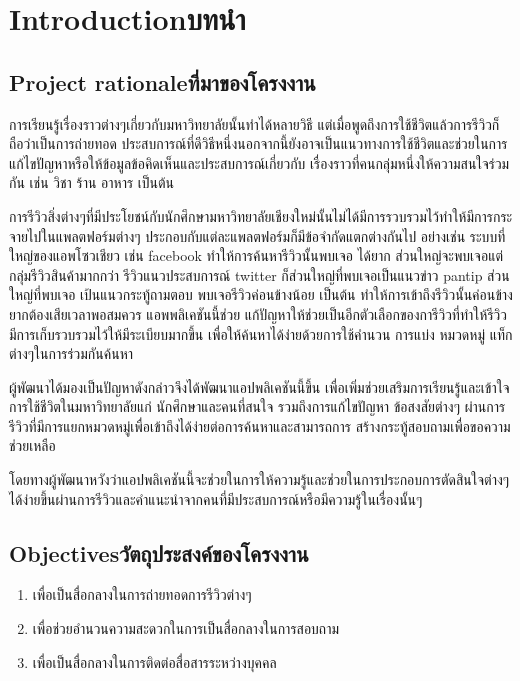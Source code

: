 \chapter{\ifenglish Introduction\else บทนำ\fi}

\section{\ifenglish Project rationale\else ที่มาของโครงงาน\fi}

การเรียนรู้เรื่องราวต่างๆเกี่ยวกับมหาวิทยาลัยนั้นทําได้หลายวิธี แต่เมื่อพูดถึงการใช้ชีวิตแล้วการรีวิวก็ถือว่าเป็นการถ่ายทอด
ประสบการณ์ที่ดีวิธีหนึ่งนอกจากนี้ยังอาจเป็นแนวทางการใช้ชีวิตและช่วยในการแก้ไขปัญหาหรือให้ข้อมูลข้อคิดเห็นและประสบการณ์เกี่ยวกับ
เรื่องราวที่คนกลุ่มหนึ่งให้ความสนใจร่วมกัน เช่น วิชา ร้าน อาหาร เป็นต้น

การรีวิวสิ่งต่างๆที่มีประโยชน์กับนักศึกษามหาวิทยาลัยเชียงใหม่นั้นไม่ได้มีการรวบรวมไว้ทําให้มีการกระจายไปในแพลตฟอร์มต่างๆ
ประกอบกับแต่ละแพลตฟอร์มก็มีข้อจํากัดแตกต่างกันไป อย่างเช่น ระบบที่ใหญ่ของแอพโซวเชียว เช่น facebook ทำให้การค้นหารีวิวนั้นพบเจอ
ได้ยาก ส่วนใหญ่จะพบเจอแต่กลุ่มรีวิวสินค้ามากกว่า รีวิวแนวประสบการณ์ twitter ก็ส่วนใหญ่ที่พบเจอเป็นแนวข่าว pantip ส่วนใหญ่ที่พบเจอ
เป้นแนวกระทู้ถามตอบ พบเจอรีวิวค่อนข้างน้อย เป็นต้น ทําให้การเข้าถึงรีวิวนั้นค่อนข้างยากต้องเสียเวลาพอสมควร แอพพลิเคชันนี้ช่วย
แก้ปัญหาให้ช่วยเป็นอีกตัวเลือกของการีวิวที่ทำให้รีวิวมีการเก็บรวบรวมไว้ให้มีระเบียบมากขึ้น เพื่อให้ค้นหาได้ง่ายด้วยการใช้คำนวน การแบ่ง
หมวดหมู่ แท็กต่างๆในการร่วมกันค้นหา

ผู้พัฒนาได้มองเป็นปัญหาดังกล่าวจึงได้พัฒนาแอปพลิเคชันนี้ขึ้น เพื่อเพิ่มช่วยเสริมการเรียนรู้และเข้าใจการใช้ชีวิตในมหาวิทยาลัยแก่
นักศึกษาและคนที่สนใจ รวมถึงการแก้ไขปัญหา ข้อสงสัยต่างๆ ผ่านการรีวิวที่มีการแยกหมวดหมู่เพื่อเข้าถึงได้ง่ายต่อการค้นหาและสามารถการ
สร้างกระทู้สอบถามเพื่อขอความช่วยเหลือ

โดยทางผู้พัฒนาหวังว่าแอปพลิเคชันนี้จะช่วยในการให้ความรู้และช่วยในการประกอบการตัดสินใจต่างๆ
ได้ง่ายขึ้นผ่านการรีวิวและคําแนะนําจากคนที่มีประสบการณ์หรือมีความรู้ในเรื่องนั้นๆ

\section{\ifenglish Objectives\else วัตถุประสงค์ของโครงงาน\fi}
\begin{enumerate}
    \item เพื่อเป็นสื่อกลางในการถ่ายทอดการรีวิวต่างๆ
    \item เพื่อช่วยอำนวนความสะดวกในการเป็นสื่อกลางในการสอบถาม
    \item เพื่อเป็นสื่อกลางในการติดต่อสื่อสารระหว่างบุคคล
\end{enumerate}

